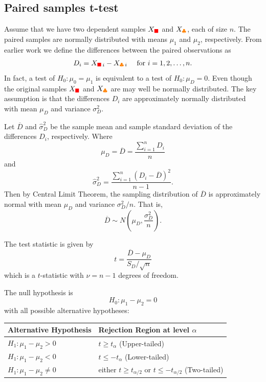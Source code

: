 \subsection{Paired samples t-test}

Assume that we have two dependent samples $X_{\color{red} \blacksquare }$ and $X_{\color{orange} \clubsuit }$, each of size $n$. The paired samples are normally distributed with means $\mu_1$ and $\mu_2$, respectively.
From earlier work we define the differences between the paired observations as 
\begin{equation}
    D_i = X_{{\color{red} \blacksquare }\, i} - X_{{\color{orange} \clubsuit }\, i} \quad \text{ for } i = 1, 2, \ldots, n.
\end{equation}
In fact, a test of $H_0 : \mu_0 = \mu_1$ is equivalent to a test of $H_0 : \mu_D = 0$.
Even though the original samples $X_{{\color{red} \blacksquare }}$ and $X_{{\color{orange} \clubsuit }}$ are may well be normally distributed.
The key assumption is that the differences $D_i$ are approximately normally distributed with mean $\mu_D$ and variance $\sigma^2_D$.

Let $\overline{D}$ and $\widehat{\sigma}^2_D$ be the sample mean and sample standard deviation of the differences $D_i$, respectively. Where
\[
    \mu_D = \overline{D} = \frac{\sum^n_{i=1} D_i}{n} 
\]
and 
\[
    \widehat{\sigma}^2_D = \frac{\sum^n_{i=1} (D_i - \overline{D})^2}{n-1}.
\]
Then by Central Limit Theorem, the sampling distribution of $\overline{D}$ is approximately normal with mean $\mu_D$ and variance $\sigma^2_D / n$. That is,
\[
    \overline{D} \sim N \left( \mu_D, \frac{\sigma^2_D}{n} \right).
\]

The test statistic is given by
\[
    t = \frac{\overline{D} - \mu_D}{S_D / \sqrt{n}}
\]
which is a $t$-statistic with $\nu = n-1$ degrees of freedom.


The null hypothesis is
\[
    H_0 : \mu_1 - \mu_2 = 0
\]
with all possible alternative hypotheses:

\renewcommand{\arraystretch}{1.2}
\begin{tabularx}{\textwidth}{|l|X|}
\hline
Alternative Hypothesis & Rejection Region at level $\alpha$\\
\hline
$H_1 : \mu_1 - \mu_2 > 0$ & $t \geq t_\alpha$ (Upper-tailed)\\
\hline
$H_1 : \mu_1 - \mu_2 < 0$ & $t \leq -t_\alpha$ (Lower-tailed)\\
\hline
$H_1 : \mu_1 - \mu_2 \neq 0$ & either $t \geq t_{\alpha/2}$ or $t \leq -t_{\alpha/2}$ (Two-tailed)\\
\hline
\end{tabularx}


